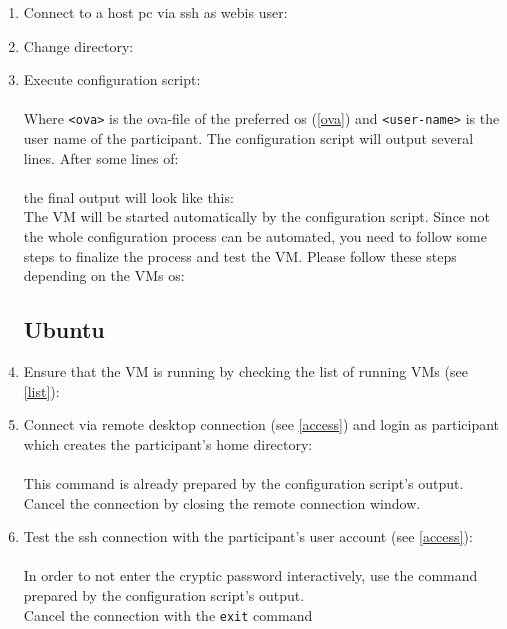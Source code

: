 \begin{enumerate}
\item Connect to a host pc via ssh as webis user:\\
\item Change directory:\\
\item Execute configuration script:\\
\\
Where \texttt{<ova>} is the ova-file of the preferred os (\ref{ova}) and \texttt{<user-name>} is the user name of the participant. The configuration script will output several lines.
After some lines of:\\
\\
the final output will look like this:\\

\medskip\noindent
The VM will be started automatically by the configuration script. Since not the whole configuration process can be automated, you need to follow some steps to finalize the process and test the VM. Please follow these steps depending on the VMs os:

\subsection*{Ubuntu}

\item Ensure that the VM is running by checking the list of running VMs (see \ref{list}):
\item Connect via remote desktop connection (see \ref{access}) and login as participant which creates the participant's home directory:\\
\\
This command is already prepared by the configuration script's output.\\
Cancel the connection by closing the remote connection window.
\item Test the ssh connection with the participant's user account (see \ref{access}):\\
\\
In order to not enter the cryptic password interactively, use the command prepared by the configuration script's output.\\
Cancel the connection with the \texttt{exit} command
\end{enumerate}


